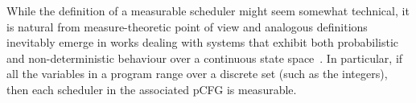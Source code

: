 While the definition of a measurable scheduler might seem somewhat technical, 
it is natural from measure-theoretic point of view and analogous definitions 
inevitably emerge in works dealing with systems that exhibit both probabilistic 
and non-deterministic behaviour over a continuous state 
space~\cite{NSK:CTMDP-delayed,NK:CTMDP-bisimulation}. In particular, if all the 
variables in a program range over a discrete set (such as the integers), 
then each scheduler in the associated pCFG is measurable.


